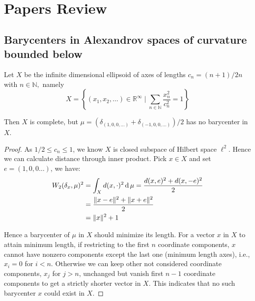 \chapter{Papers Review}
\section{Barycenters in Alexandrov spaces of curvature bounded below}
\begin{prop}[Example 3.1 a]
	Let \( X \) be the infinite dimensional ellipsoid of axes of lengths \( c _ { n } = ( n + 1 ) / 2 n \) with \( n \in \mathbb { N } , \) namely 
	\[
	X = \left\{ \left( x _ { 1 } , x _ { 2 } , \ldots \right) \in \mathbb { R } ^ { \infty } \mid \sum _ { n \in \mathbb { N } } \frac { x _ { n } ^ { 2 } } { c _ { n } ^ { 2 } } = 1 \right\} 
\]

	Then \( X \) is complete, but \( \mu = \left( \delta _ { ( 1,0,0 , \ldots ) } + \delta _ { ( - 1,0,0 , \ldots ) } \right) / 2 \) has no barycenter in \( X \).
\end{prop}

\begin{proof}
	As $ 1 / 2 \leq c_{n} \leq 1$, we know $X$ is closed subspace of Hilbert space $\ell^2$. Hence we can calculate distance through inner product. Pick $ x \in X$ and set $ e=(1,0,0\ldots)$, we have:
	\begin{align*}
		W_2(\delta_x, \mu)^2 & = \int_{X} d(x, \cdot)^2 \operatorname{d} \mu = \frac{d(x,e)^2+d(x,-e)^2 }{2} \\
		                     & =\frac{\Vert x - e \Vert^2 + \Vert x + e \Vert^2}{2}               \\
		                     & =\Vert x \Vert^2 + 1
	\end{align*}

	Hence a barycenter of $\mu$ in $X$ should minimize its length. For a vector $x$ in $X$ to attain minimum length, if restricting to the first $n$ coordinate components, $x$ cannot have nonzero components except the last one (minimum length axes), i.e., $x_i =0$ for $i<n$. Otherwise we can keep other not considered coordinate components, $x_j$ for $j>n$,  unchanged but vanish first $n-1$ coordinate components to get a strictly shorter vector in $X$. This indicates that no such barycenter $x$ could exist in $X$.
\end{proof}


